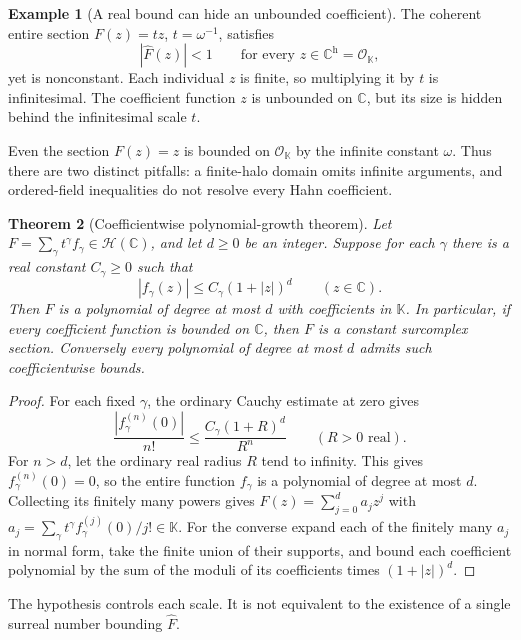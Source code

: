 \documentclass[11pt,a4paper]{article}
\newtheorem{theorem}{Theorem}[section]
\theoremstyle{definition}\newtheorem{definition}[theorem]{Definition}
\newtheorem{example}[theorem]{Example}
\theoremstyle{remark}\newtheorem{remark}[theorem]{Remark}
\newcommand{\K}{\mathbb K}
\newcommand{\C}{\mathbb C}\newcommand{\R}{\mathbb R}\newcommand{\N}{\mathbb N}\newcommand{\Z}{\mathbb Z}
\newcommand{\A}{\mathscr H}\newcommand{\hol}{\mathcal O}
\newcommand{\fin}{\mathcal O_{\K}}\newcommand{\infinit}{\mathfrak m_{\K}}
\newcommand{\ev}[1]{\widehat{#1}}
\newcommand{\halo}[1]{#1^{\mathrm h}}
\numberwithin{equation}{section}
\begin{document}
\begin{example}[A real bound can hide an unbounded coefficient]\label{ex:tz}
The coherent entire section $F(z)=tz$, $t=\omega^{-1}$, satisfies
\[
 |\ev F(z)|<1\qquad\text{for every }z\in\halo\C=\fin,
\]
yet is nonconstant. Each individual $z$ is finite, so multiplying it by $t$ is infinitesimal. The coefficient function $z$ is unbounded on $\C$, but its size is hidden behind the infinitesimal scale $t$.
\end{example}
Even the section $F(z)=z$ is bounded on $\fin$ by the infinite constant $\omega$. Thus there are two distinct pitfalls: a finite-halo domain omits infinite arguments, and ordered-field inequalities do not resolve every Hahn coefficient.

\begin{theorem}[Coefficientwise polynomial-growth theorem]\label{thm:Liouville}
Let $F=\sum_\gamma t^\gamma f_\gamma\in\A(\C)$, and let $d\geq0$ be an integer. Suppose for each $\gamma$ there is a real constant $C_\gamma\geq0$ such that
\[
 |f_\gamma(z)|\leq C_\gamma(1+|z|)^d
 \qquad(z\in\C).
\]
Then $F$ is a polynomial of degree at most $d$ with coefficients in $\K$. In particular, if every coefficient function is bounded on $\C$, then $F$ is a constant surcomplex section. Conversely every polynomial of degree at most $d$ admits such coefficientwise bounds.
\end{theorem}
\begin{proof}
For each fixed $\gamma$, the ordinary Cauchy estimate at zero gives
\[
 \frac{|f_\gamma^{(n)}(0)|}{n!}
 \leq \frac{C_\gamma(1+R)^d}{R^n}
 \qquad(R>0\text{ real}).
\]
For $n>d$, let the ordinary real radius $R$ tend to infinity. This gives $f_\gamma^{(n)}(0)=0$, so the entire function $f_\gamma$ is a polynomial of degree at most $d$. Collecting its finitely many powers gives
$F(z)=\sum_{j=0}^d a_jz^j$ with
$a_j=\sum_\gamma t^\gamma f_\gamma^{(j)}(0)/j!\in\K$.
For the converse expand each of the finitely many $a_j$ in normal form, take the finite union of their supports, and bound each coefficient polynomial by the sum of the moduli of its coefficients times $(1+|z|)^d$.
\end{proof}
The hypothesis controls each scale. It is not equivalent to the existence of a single surreal number bounding $\ev F$.
\end{document}
